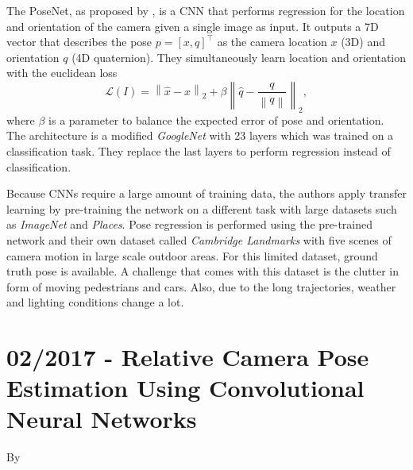 			The PoseNet, as proposed by \cite{kendall2015posenet}, is a CNN that performs regression for the location and orientation of the camera given a single image as input.
			It outputs a 7D vector that describes the pose $p = [x, q]^\top$ as the camera location $x$ (3D) and orientation $q$ (4D quaternion).
			They simultaneously learn location and orientation with the euclidean loss
			\begin{equation}
				\mathcal{L}(I) = 
						\left\|
							\hat{x} - x 
						\right\|_2 
						+ \beta 
						\left\| 
							\hat{q} - \frac{q}{\left\| q \right\|} 
						\right\|_2,
			\end{equation}
			where $\beta$ is a parameter to balance the expected error of pose and orientation.
			The architecture is a modified \emph{GoogleNet} with 23 layers which was trained on a classification task.
			They replace the last layers to perform regression instead of classification.
			
			Because CNNs require a large amount of training data, the authors apply transfer learning by pre-training the network on a different task with large datasets such as \emph{ImageNet} and \emph{Places}.
			Pose regression is performed using the pre-trained network and their own dataset called \emph{Cambridge Landmarks} with five scenes of camera motion in large scale outdoor areas.
			For this limited dataset, ground truth pose is available.
			A challenge that comes with this dataset is the clutter in form of moving pedestrians and cars.
			Also, due to the long trajectories, weather and lighting conditions change a lot.
			
			
			
		
		\section{02/2017 - Relative Camera Pose Estimation Using Convolutional Neural Networks}
			By \cite{melekhov2017poseCNN}
			\\
		
		
		
		
		